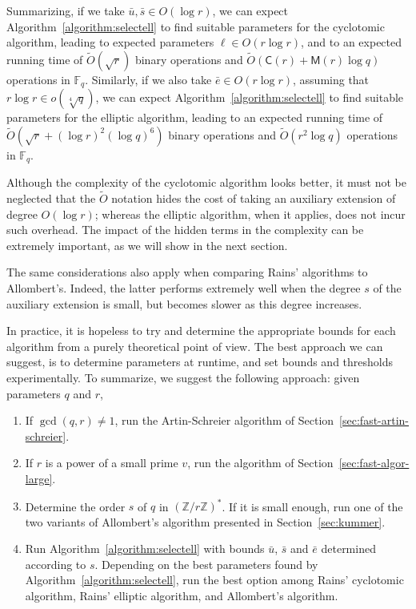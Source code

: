 \documentclass[12pt]{article}
\theoremstyle{plain}
\theoremstyle{definition}
\newcommand{\tildO}{\tilde{O}}
\def\Z{\ensuremath{\mathbb{Z}}}
\def\F{\ensuremath{\mathbb{F}}}
\def\MM{\ensuremath{\mathsf{M}}}
\def\CC{\ensuremath{\mathsf{C}}}
\newcounter{algorithm}
\begin{document}
Summarizing, if we take $\bar{u},\bar{s}\in O(\log r)$, we can expect
Algorithm~\ref{algorithm:selectell} to find suitable parameters for
the cyclotomic algorithm, leading to expected parameters $\ell\in
O(r\log r)$, and to an expected running time of $\tildO(\sqrt{r})$
binary operations and $\tildO(\CC(r)+\MM(r)\log q)$ operations in
$\F_q$.  Similarly, if we also take $\bar{e}\in O(r\log r)$,
assuming that $r\log r\in o(\sqrt[4]{q})$, we can expect
Algorithm~\ref{algorithm:selectell} to find suitable parameters for
the elliptic algorithm, leading to an expected running time of
$\tildO(\sqrt{r}+(\log r)^2(\log q)^6)$ binary operations and
$\tildO(r^2\log q)$ operations in $\F_q$.

Although the complexity of the cyclotomic algorithm looks better, it
must not be neglected that the $\tildO$ notation
hides the cost of taking an auxiliary extension of degree
$O(\log r)$; whereas the elliptic algorithm, when it applies, does
not incur such overhead. The impact of the hidden terms in the
complexity can be extremely important, as we will show in the next
section. 

The same considerations also apply when comparing Rains' algorithms to
Allombert's. Indeed, the latter performs extremely well when the
degree $s$ of the auxiliary extension is small, but becomes slower as
this degree increases.

In practice, it is hopeless to try and determine the appropriate
bounds for each algorithm from a purely theoretical point of view. The
best approach we can suggest, is to determine parameters at runtime,
and set bounds and thresholds experimentally. To summarize, we suggest
the following approach: given parameters $q$ and $r$,
\begin{enumerate}
\item If $\gcd(q,r)\ne 1$, run the Artin-Schreier algorithm of
  Section~\ref{sec:fast-artin-schreier}.
\item If $r$ is a power of a small prime $v$, run the algorithm of
  Section~\ref{sec:fast-algor-large}.
\item Determine the order $s$ of $q$ in $(\Z/r\Z)^\ast$. If it is
  small enough, run one of the two variants of Allombert's algorithm
  presented in Section~\ref{sec:kummer}.
\item Run Algorithm~\ref{algorithm:selectell} with bounds $\bar{u}$,
  $\bar{s}$ and $\bar{e}$ determined according to $s$. Depending on
  the best parameters found by Algorithm~\ref{algorithm:selectell},
  run the best option among Rains' cyclotomic algorithm, Rains'
  elliptic algorithm, and Allombert's algorithm.
\end{enumerate}
\end{document}
